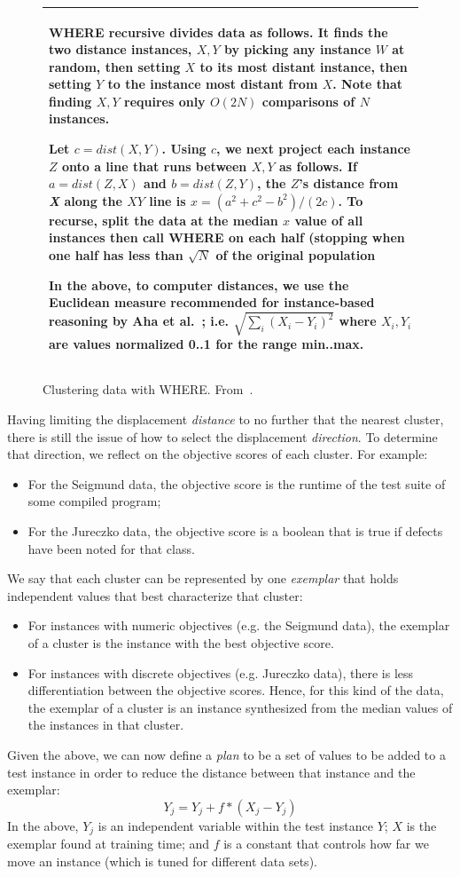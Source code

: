 \documentclass[conference]{IEEEtran}
\newcommand{\bi}{\begin{itemize}}
\newcommand{\ei}{\end{itemize}}
\begin{document}
\begin{figure}[t!]
\small
\begin{tabular}{|p{.95\linewidth}|}\hline
WHERE recursive divides data as follows.
It finds the two   distance instances,  $X,Y$
by picking any instance $W$ at random, then setting $X$ to its most
distant instance, then setting $Y$ to the instance most distant from
$X$. 
Note that finding $X,Y$ requires only $O(2N)$ comparisons
of $N$ instances.

Let $c=dist(X,Y)$. Using $c$, we next  project each instance $Z$
onto a line that  runs between $X,Y$ as follows. If $a=dist(Z,X)$ and
$b=dist(Z,Y)$, the $Z$'s
distance from   {\em X} along the $XY$ line is
$x=(a^2 + c^2 - b^2)/(2c)$.
To recurse, split the data at the median $x$ value of all instances then call WHERE on each half (stopping when
one half has less  than $\sqrt{N}$ of the original population 

In the above, to computer distances, we use
the Euclidean measure recommended for
instance-based reasoning by Aha et al.~\cite{aha91};
i.e. $\sqrt{\sum_i(X_i-Y_i)^2}$ where $X_i,Y_i$
are values normalized 0..1 for the range min..max.
\\\hline
\end{tabular}
\caption{Clustering data with WHERE. From~\cite{me12d}.}\label{fig:where}
\end{figure}




Having  limiting the displacement {\em distance} to no further that
the nearest  cluster,
there is still the issue of how to select the displacement 
{\em direction}. 
To determine that direction, we reflect on the objective
scores of each cluster.
For example:
\bi 
\item
For the Seigmund data,
the objective score is the runtime of the test suite of some compiled program;
\item
For the Jureczko data, the objective score
is a boolean that is true if defects have been noted
for that class.
\ei
We say that each cluster can be represented by one
{\em exemplar} that
holds independent values that best characterize that cluster:
\bi
\item
For
instances with numeric objectives (e.g. the Seigmund data), 
the exemplar of a cluster is the instance
with the best objective score.
\item
For instances with discrete objectives (e.g. Jureczko data),
there is less differentiation between the objective scores.
Hence, for this kind of the data, the exemplar of a cluster is
an instance synthesized from the median values of the instances
in that cluster.
\ei
Given the above, we can now define a {\em plan} to be
a set of values to be added to a test instance in order
to reduce the distance between that instance and the exemplar: 
\[Y_j = Y_j + f*(X_j - Y_j)\]
In the above, $Y_j$ is an independent variable within the
test instance $Y$; $X$ is the exemplar found at training time;
and  $f$ is a constant that controls
how far we  move an instance (which is tuned for different data
sets).
\end{document}

